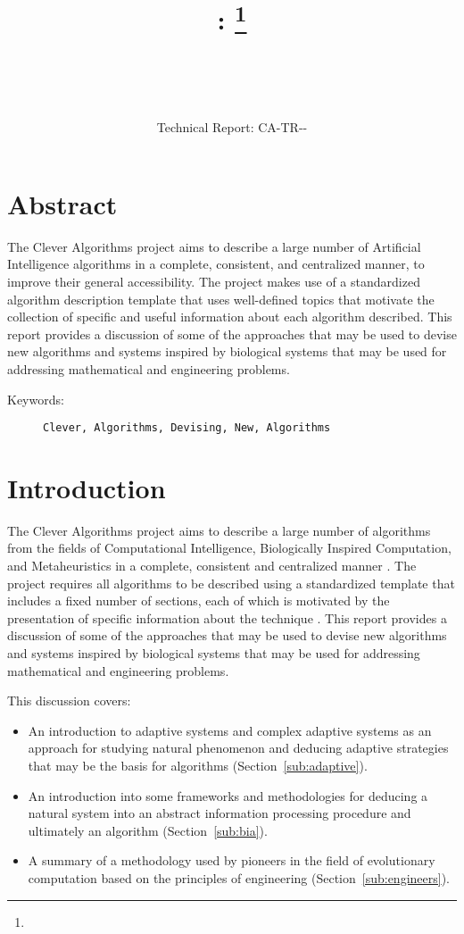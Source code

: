 \documentclass[a4paper, 11pt]{article}
\title{{\myreporttitle}: {\myreportsubtitle}\footnote{\myreportlicense}}
\author{\myreportauthor\\{\myreportemail}\\\small\myreportproject}
\date{\myreportfulldate\\{\small{Technical Report: CA-TR-{\myreportdate}-\myreportversion}}}
\begin{document}
\maketitle

\section*{Abstract} 
The Clever Algorithms project aims to describe a large number of Artificial Intelligence algorithms in a complete, consistent, and centralized manner, to improve their general accessibility. 
The project makes use of a standardized algorithm description template that uses well-defined topics that motivate the collection of specific and useful information about each algorithm described.
This report provides a discussion of some of the approaches that may be used to devise new algorithms and systems inspired by biological systems that may be used for addressing mathematical and engineering problems.

\begin{description}
	\item[Keywords:] {\small\texttt{Clever, Algorithms, Devising, New, Algorithms}}
\end{description} 

\section{Introduction}
\label{sec:introduction}
The Clever Algorithms project aims to describe a large number of algorithms from the fields of Computational Intelligence, Biologically Inspired Computation, and Metaheuristics in a complete, consistent and centralized manner \cite{Brownlee2010}.
The project requires all algorithms to be described using a standardized template that includes a fixed number of sections, each of which is motivated by the presentation of specific information about the technique \cite{Brownlee2010a}.
This report provides a discussion of some of the approaches that may be used to devise new algorithms and systems inspired by biological systems that may be used for addressing mathematical and engineering problems.

This discussion covers:

\begin{itemize}
	\item An introduction to adaptive systems and complex adaptive systems as an approach for studying natural phenomenon and deducing adaptive strategies that may be the basis for algorithms (Section~\ref{sub:adaptive}).
	\item An introduction into some frameworks and methodologies for deducing a natural system into an abstract information processing procedure and ultimately an algorithm (Section~\ref{sub:bia}).
	\item A summary of a methodology used by pioneers in the field of evolutionary computation based on the principles of engineering (Section~\ref{sub:engineers}).
\end{itemize}
\end{document}
